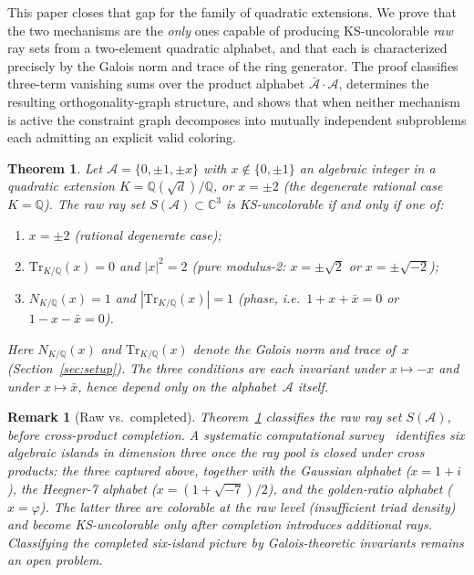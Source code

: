 \documentclass[12pt,a4paper]{article}
\newtheorem{theorem}{Theorem}
\newtheorem{remark}{Remark}
\newcommand{\C}{\mathbb{C}}
\newcommand{\Q}{\mathbb{Q}}
\newcommand{\Norm}[1]{N_{K/\Q}\!\left(#1\right)}
\newcommand{\Tr}[1]{\mathrm{Tr}_{K/\Q}\!\left(#1\right)}
\begin{document}
This paper closes that gap for the family of quadratic extensions.  We
prove that the two mechanisms are the \emph{only} ones capable of
producing KS-uncolorable \emph{raw} ray sets from a two-element
quadratic alphabet,
and that each is characterized precisely by the Galois norm and trace of
the ring generator.  The proof classifies
three-term vanishing sums over the product alphabet
$\bar{\mathcal{A}} \cdot \mathcal{A}$, determines the resulting
orthogonality-graph structure, and shows that when neither mechanism is
active the constraint graph decomposes into mutually independent
subproblems each admitting an explicit valid coloring.

\begin{theorem}\label{thm:main}
Let $\mathcal{A} = \{0,\pm 1,\pm x\}$ with $x \notin \{0, \pm 1\}$ an
algebraic integer in a quadratic extension $K = \Q(\sqrt d)/\Q$, or
$x = \pm 2$ (the degenerate rational case $K = \Q$).
The \emph{raw} ray set $S(\mathcal{A}) \subset \C^3$ is KS-uncolorable
if and only if one of:
\begin{enumerate}
  \item[(R)]  $x = \pm 2$ \emph{(rational degenerate case)};
  \item[(i)]  $\Tr{x} = 0$ and $|x|^2 = 2$ \emph{(pure modulus-2:
    $x = \pm\sqrt{2}$ or $x = \pm\sqrt{-2}$)};
  \item[(ii)] $\Norm{x} = 1$ and $|\Tr{x}| = 1$ \emph{(phase, i.e.\
    $1 + x + \bar x = 0$ or $1 - x - \bar x = 0$)}.
\end{enumerate}
Here $\Norm{x}$ and $\Tr{x}$ denote the Galois norm and trace of~$x$
(Section~\ref{sec:setup}).  The three conditions are each invariant under
$x \mapsto -x$ and under $x \mapsto \bar x$, hence depend only on the
alphabet~$\mathcal{A}$ itself.
\end{theorem}

\begin{remark}[Raw vs.\ completed]\label{rem:raw-scope}
Theorem~\ref{thm:main} classifies the \emph{raw} ray set
$S(\mathcal{A})$, before cross-product completion.  A systematic
computational survey~\cite{Kernaghan2026islands} identifies
\emph{six} algebraic islands in dimension three once the ray pool is
closed under cross products: the three captured above, together with
the Gaussian alphabet ($x = 1+i$), the Heegner-7 alphabet
($x = (1+\sqrt{-7})/2$), and the golden-ratio alphabet ($x = \varphi$).
The latter three are \emph{colorable} at the raw level (insufficient
triad density) and become KS-uncolorable only after completion
introduces additional rays.  Classifying the completed six-island
picture by Galois-theoretic invariants remains an open problem.
\end{remark}
\end{document}
